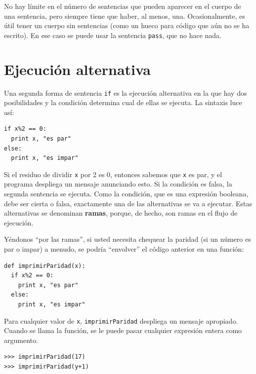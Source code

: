 
No hay límite en el número de sentencias que pueden aparecer en el cuerpo
de una sentencia, pero siempre tiene que haber, al menos, una.
Ocasionalmente, es útil tener un cuerpo sin sentencias (como un 
hueco para código que aún no se ha escrito). En ese caso se puede
usar la sentencia  \texttt{pass}, que no hace nada.




\section{Ejecución alternativa}
\label{alternative execution}

Una segunda forma de sentencia  \texttt{if} es la ejecución alternativa
en la que hay dos posibilidades y la condición determina cual de ellas
se ejecuta. La sintaxis luce así:

\beforeverb
\begin{verbatim}
if x%2 == 0:
  print x, "es par"
else:
  print x, "es impar"
\end{verbatim}
\afterverb
%

Si el residuo de dividir \texttt{x} por  2 es 0, entonces sabemos 
que \texttt{x} es par, y el programa despliega un mensaje anunciando esto.
Si la condición es falsa, la segunda sentencia se ejecuta. Como la condición, 
que es una expresión booleana, debe ser cierta o falsa, exactamente una
de las alternativas se va a ejecutar. Estas alternativas se denominan
{\bf ramas}, porque, de hecho, son ramas en el flujo de ejecución.


Yéndonos ``por las ramas'', si usted necesita chequear la paridad
(si un número es par o impar) a menudo, se podría ``envolver''
el código anterior en una función:

\beforeverb
\begin{verbatim}
def imprimirParidad(x):
  if x%2 == 0:
    print x, "es par"
  else:
    print x, "es impar"
\end{verbatim}
\afterverb
%
Para cualquier valor de \texttt{x}, \texttt{imprimirParidad} despliega
un mensaje apropiado. Cuando se llama la función, se le puede pasar
cualquier expresión entera como argumento.

\beforeverb
\begin{verbatim}
>>> imprimirParidad(17)
>>> imprimirParidad(y+1)
\end{verbatim}
\afterverb
%


